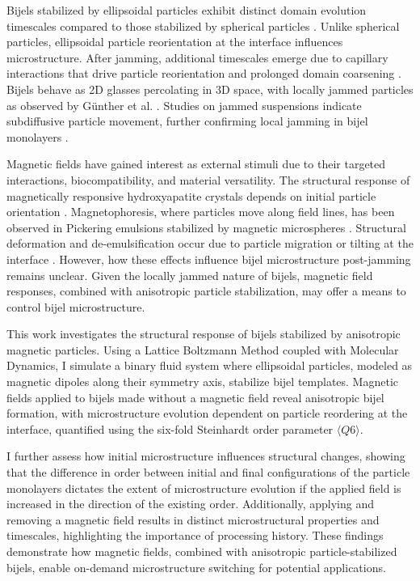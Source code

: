 Bijels stabilized by ellipsoidal particles exhibit distinct domain evolution timescales compared to those stabilized by 
spherical particles \cite{gunther_timescales_2014}. Unlike spherical particles, ellipsoidal particle reorientation at the 
interface influences microstructure. After jamming, additional timescales emerge due to capillary interactions that drive 
particle reorientation and prolonged domain coarsening \cite{gunther_timescales_2014}. Bijels behave as 2D glasses percolating 
in 3D space, with locally jammed particles as observed by Günther et al. 
\cite{ching_bijel_2022, torquato_jammed_2010, gunther_timescales_2014}. Studies on jammed suspensions indicate subdiffusive 
particle movement, further confirming local jamming in bijel monolayers \cite{savelev_diffusion_2006}.

Magnetic fields have gained interest as external stimuli due to their targeted interactions, biocompatibility, and material 
versatility. The structural response of magnetically responsive hydroxyapatite crystals depends on initial particle orientation
\cite{nakayama_stimuli-responsive_2018}. Magnetophoresis, where particles move along field lines, has been observed in Pickering 
emulsions stabilized by magnetic microspheres \cite{tham_magnetophoresis_2021}. Structural deformation and de-emulsification occur due 
to particle migration or tilting at the interface \cite{yang_rapid_2020, misra_magnetic_2020}. However, how these effects influence 
bijel microstructure post-jamming remains unclear. Given the locally jammed nature of bijels, magnetic field responses, combined with 
anisotropic particle stabilization, may offer a means to control bijel microstructure.

This work investigates the structural response of bijels stabilized by anisotropic magnetic particles. Using a Lattice Boltzmann Method 
coupled with Molecular Dynamics, I simulate a binary fluid system where ellipsoidal particles, modeled as magnetic dipoles along their 
symmetry axis, stabilize bijel templates. Magnetic fields applied to bijels made without a magnetic field reveal anisotropic bijel formation, 
with microstructure evolution dependent on particle reordering at the interface, quantified using the six-fold 
Steinhardt order parameter $\langle Q6 \rangle$.

I further assess how initial microstructure influences structural changes, showing that the difference in order between initial and final 
configurations of the particle monolayers dictates the extent of microstructure evolution if the applied field is increased in the direction of 
the existing order. Additionally, applying and removing a 
magnetic field results in distinct microstructural properties and timescales, highlighting the importance of processing history. These findings 
demonstrate how magnetic fields, combined with anisotropic particle-stabilized bijels, enable on-demand microstructure switching for potential applications.

